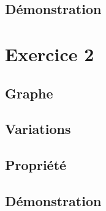 \subsection{Démonstration}

\section{Exercice 2}

\subsection{Graphe}

\subsection{Variations}

\subsection{Propriété}

\subsection{Démonstration}

